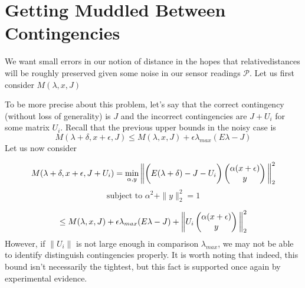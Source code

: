 \section{Getting Muddled Between Contingencies}
We want small errors in our notion of distance in the hopes that relativedistances will be roughly preserved given some noise in our sensor readings $\mathcal{P}$. Let us first consider $M(\lambda, x, J)$  

To be more precise about this problem, let's say that the correct contingency (without loss of generality) is $J$ and the incorrect contingencies are $J + U_i$ for some matrix $U_i$. Recall that the previous upper bounds in the noisy case is
$$ M(\lambda + \delta, x + \epsilon, J) \leq M(\lambda, x, J) + \epsilon\lambda_{max}(E {\lambda} - J)$$ 
Let us now consider

\begin{equation}
M(\lambda + \delta, x + \epsilon, J + U_i) = \min_{\alpha, y} \bigg{ \| } \bigg{(}E (\lambda + \delta) - J - U_i\bigg{)}
\begin{pmatrix}
\alpha (x + \epsilon) \\
y
\end{pmatrix}
     \bigg{ \| }_2^2
\end{equation}
$$ \text{subject to } \alpha^2 + \|y\|_2^2 = 1$$

$$ \leq M(\lambda , x, J) + \epsilon\lambda_{max}(E {\lambda} - J) + \bigg{\|}U_i
\begin{pmatrix}
\alpha (x + \epsilon) \\
y
\end{pmatrix}\bigg{\|}_2^2
$$ 
However, if $\|U_i\|$ is not large enough in comparison $\lambda_{max}$, we may not be able to identify distinguish contingencies properly. It is worth noting that indeed, this bound isn't necessarily the tightest, but this fact is supported once again by experimental evidence.

